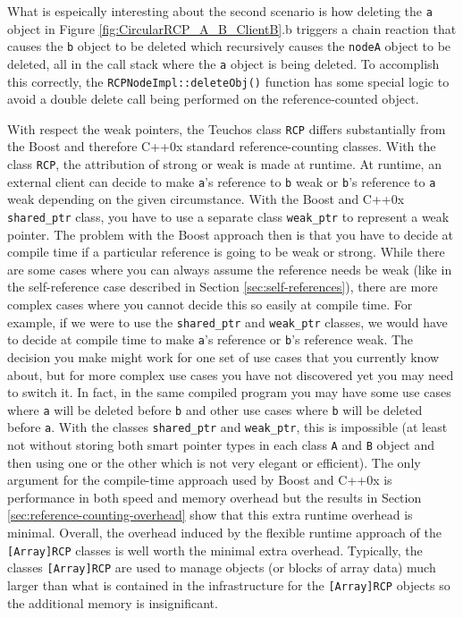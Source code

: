 \documentclass[pdf,ps2pdf,11pt]{SANDreport}
\begin{document}
What is espeically interesting about the second scenario is how
deleting the {}\texttt{a} object in Figure
{}\ref{fig:CircularRCP_A_B_ClientB}.b triggers a chain reaction that
causes the {}\texttt{b} object to be deleted which recursively causes
the {}\texttt{nodeA} object to be deleted, all in the call stack where
the {}\texttt{a} object is being deleted.  To accomplish this
correctly, the {}\texttt{RCPNodeImpl::deleteObj()} function has some
special logic to avoid a double delete call being performed on the
reference-counted object.

With respect the weak pointers, the Teuchos class {}\texttt{RCP}
differs substantially from the Boost and therefore C++0x standard
reference-counting classes.  With the class {}\texttt{RCP}, the
attribution of strong or weak is made at runtime.  At runtime, an
external client can decide to make {}\texttt{a}'s reference to
{}\texttt{b} weak or {}\texttt{b}'s reference to {}\texttt{a} weak
depending on the given circumstance.  With the Boost and C++0x
{}\texttt{shared\_ptr} class, you have to use a separate class
{}\texttt{weak\_ptr} to represent a weak pointer.  The problem with
the Boost approach then is that you have to decide at compile time if
a particular reference is going to be weak or strong.  While there are
some cases where you can always assume the reference needs be weak
(like in the self-reference case described in Section
{}\ref{sec:self-references}), there are more complex cases where you
cannot decide this so easily at compile time.  For example, if we were
to use the {}\texttt{shared\_ptr} and {}\texttt{weak\_ptr} classes, we
would have to decide at compile time to make {}\texttt{a}'s reference
or {}\texttt{b}'s reference weak.  The decision you make might work
for one set of use cases that you currently know about, but for more
complex use cases you have not discovered yet you may need to switch
it.  In fact, in the same compiled program you may have some use cases
where {}\texttt{a} will be deleted before {}\texttt{b} and other use
cases where {}\texttt{b} will be deleted before {}\texttt{a}.  With
the classes {}\texttt{shared\_ptr} and {}\texttt{weak\_ptr}, this is
impossible (at least not without storing both smart pointer types in
each class {}\texttt{A} and {}\texttt{B} object and then using one or
the other which is not very elegant or efficient).  The only argument
for the compile-time approach used by Boost and C++0x is performance
in both speed and memory overhead but the results in Section
{}\ref{sec:reference-counting-overhead} show that this extra runtime
overhead is minimal.  Overall, the overhead induced by the flexible
runtime approach of the {}\texttt{[Array]RCP} classes is well worth
the minimal extra overhead.  Typically, the classes
{}\texttt{[Array]RCP} are used to manage objects (or blocks of array
data) much larger than what is contained in the infrastructure for the
{}\texttt{[Array]RCP} objects so the additional memory is
insignificant.
\end{document}
